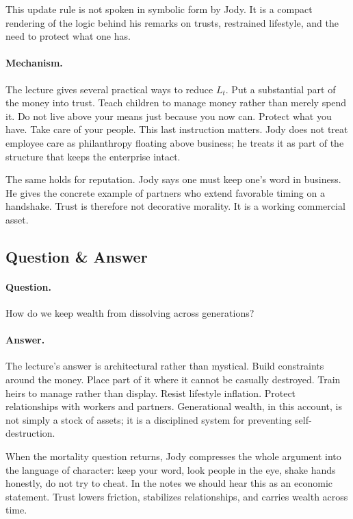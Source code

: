\begin{remark}
This update rule is not spoken in symbolic form by Jody. It is a compact rendering of the logic behind his remarks on trusts, restrained lifestyle, and the need to protect what one has.
\end{remark}

\paragraph{Mechanism.}
The lecture gives several practical ways to reduce \(L_t\). Put a substantial part of the money into trust. Teach children to manage money rather than merely spend it. Do not live above your means just because you now can. Protect what you have. Take care of your people. This last instruction matters. Jody does not treat employee care as philanthropy floating above business; he treats it as part of the structure that keeps the enterprise intact.

The same holds for reputation. Jody says one must keep one's word in business. He gives the concrete example of partners who extend favorable timing on a handshake. Trust is therefore not decorative morality. It is a working commercial asset.

\subsection{Question \& Answer}

\paragraph{Question.}
How do we keep wealth from dissolving across generations?

\paragraph{Answer.}
The lecture's answer is architectural rather than mystical. Build constraints around the money. Place part of it where it cannot be casually destroyed. Train heirs to manage rather than display. Resist lifestyle inflation. Protect relationships with workers and partners. Generational wealth, in this account, is not simply a stock of assets; it is a disciplined system for preventing self-destruction.

When the mortality question returns, Jody compresses the whole argument into the language of character: keep your word, look people in the eye, shake hands honestly, do not try to cheat. In the notes we should hear this as an economic statement. Trust lowers friction, stabilizes relationships, and carries wealth across time.

